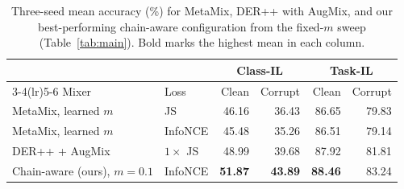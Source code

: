 \begin{table}[H]
    \centering\footnotesize\setlength{\tabcolsep}{2pt}
    \begin{tabular}{llrrrr}
        \toprule
        & & \multicolumn{2}{c}{Class-IL} & \multicolumn{2}{c}{Task-IL} \\
        \cmidrule(lr){3-4}\cmidrule(lr){5-6}
        Mixer & Loss & Clean & Corrupt & Clean & Corrupt \\
        \midrule
        MetaMix, learned $m$ & JS & 46.16 & 36.43 & 86.65 & 79.83 \\
        MetaMix, learned $m$ & InfoNCE & 45.48 & 35.26 & 86.51 & 79.14 \\
        DER++ + AugMix & $1\times$ JS & 48.99 & 39.68 & 87.92 & 81.81 \\
        \midrule
        Chain-aware (ours), $m=0.1$ & InfoNCE & \textbf{51.87} & \textbf{43.89} & \textbf{88.46} & 83.24 \\
        \bottomrule
    \end{tabular}
    \caption{Three-seed mean accuracy (\%) for MetaMix, DER++ with AugMix, and our best-performing chain-aware configuration from the fixed-$m$ sweep (Table~\ref{tab:main}). Bold marks the highest mean in each column.}\label{tab:reference}
\end{table}
